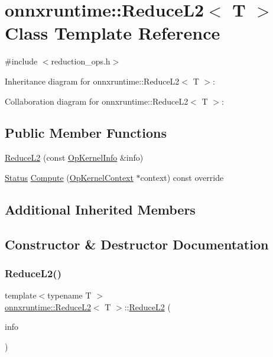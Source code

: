 \hypertarget{classonnxruntime_1_1ReduceL2}{}\section{onnxruntime\+:\+:Reduce\+L2$<$ T $>$ Class Template Reference}
\label{classonnxruntime_1_1ReduceL2}


{\ttfamily \#include $<$reduction\+\_\+ops.\+h$>$}



Inheritance diagram for onnxruntime\+:\+:Reduce\+L2$<$ T $>$\+:


Collaboration diagram for onnxruntime\+:\+:Reduce\+L2$<$ T $>$\+:
\subsection*{Public Member Functions}
\begin{DoxyCompactItemize}
\item 
\mbox{\hyperlink{classonnxruntime_1_1ReduceL2_aa30fffc58fa4d4c5a9cd186ecb52b842}{Reduce\+L2}} (const \mbox{\hyperlink{classonnxruntime_1_1OpKernelInfo}{Op\+Kernel\+Info}} \&info)
\item 
\mbox{\hyperlink{classonnxruntime_1_1common_1_1Status}{Status}} \mbox{\hyperlink{classonnxruntime_1_1ReduceL2_a76783ef262527c9b2b03254f30331df6}{Compute}} (\mbox{\hyperlink{classonnxruntime_1_1OpKernelContext}{Op\+Kernel\+Context}} $\ast$context) const override
\end{DoxyCompactItemize}
\subsection*{Additional Inherited Members}


\subsection{Constructor \& Destructor Documentation}
\mbox{\label{classonnxruntime_1_1ReduceL2_aa30fffc58fa4d4c5a9cd186ecb52b842}} 
\subsubsection{\texorpdfstring{Reduce\+L2()}{ReduceL2()}}
{\footnotesize\ttfamily template$<$typename T $>$ \\
\mbox{\hyperlink{classonnxruntime_1_1ReduceL2}{onnxruntime\+::\+Reduce\+L2}}$<$ T $>$\+::\mbox{\hyperlink{classonnxruntime_1_1ReduceL2}{Reduce\+L2}} (\begin{DoxyParamCaption}\item[{const \mbox{\hyperlink{classonnxruntime_1_1OpKernelInfo}{Op\+Kernel\+Info}} \&}]{info }\end{DoxyParamCaption})\hspace{0.3cm}{\ttfamily [inline]}}



